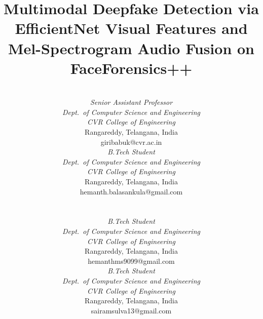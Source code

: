 \documentclass[conference]{IEEEtran}
\begin{document}
\title{Multimodal Deepfake Detection via EfficientNet Visual Features and\\
Mel-Spectrogram Audio Fusion on FaceForensics++}

\author{%
\begin{tabular}{cc}
  \begin{minipage}[t]{0.44\linewidth}\centering
    {\small Giri Babu K}\\[3pt]
    {\small\itshape Senior Assistant Professor}\\
    {\small\itshape Dept.\ of Computer Science and Engineering}\\
    {\small\itshape CVR College of Engineering}\\
    {\small Rangareddy, Telangana, India}\\
    {\small giribabuk@cvr.ac.in}
  \end{minipage}
  &
  \begin{minipage}[t]{0.44\linewidth}\centering
    {\small B. Hemanth Rao}\\[3pt]
    {\small\itshape B.Tech Student}\\
    {\small\itshape Dept.\ of Computer Science and Engineering}\\
    {\small\itshape CVR College of Engineering}\\
    {\small Rangareddy, Telangana, India}\\
    {\small hemanth.balasankula@gmail.com}
  \end{minipage}\\
  \multicolumn{2}{c}{\rule{0pt}{28pt}}\\
  \begin{minipage}[t]{0.44\linewidth}\centering
    {\small T. Hemanth Reddy}\\[3pt]
    {\small\itshape B.Tech Student}\\
    {\small\itshape Dept.\ of Computer Science and Engineering}\\
    {\small\itshape CVR College of Engineering}\\
    {\small Rangareddy, Telangana, India}\\
    {\small hemanthms9099@gmail.com}
  \end{minipage}
  &
  \begin{minipage}[t]{0.44\linewidth}\centering
    {\small S. Sai Ram}\\[3pt]
    {\small\itshape B.Tech Student}\\
    {\small\itshape Dept.\ of Computer Science and Engineering}\\
    {\small\itshape CVR College of Engineering}\\
    {\small Rangareddy, Telangana, India}\\
    {\small sairamsulva13@gmail.com}
  \end{minipage}
\end{tabular}%
}
\end{document}
